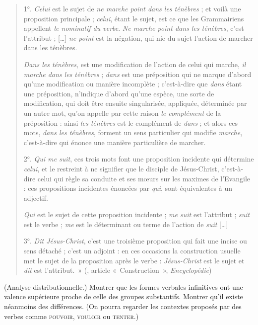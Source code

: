 {\begin{quote}
    1°. \textit{Celui} est le sujet de \textit{ne marche point dans les ténèbres} ; et voilà une proposition principale ; \textit{celui}, étant le sujet, est ce que les Grammairiens appellent \textit{le nominatif du verbe}. \textit{Ne marche point dans les ténèbres}, c’est l’attribut ; […] \textit{ne point} est la négation, qui nie du sujet l’action de marcher dans les ténèbres.

    \textit{Dans les ténèbres}, est une modification de l’action de celui qui marche, \textit{il marche dans les ténèbres} ; \textit{dans} est une préposition qui ne marque d’abord qu’une modification ou manière incomplète ; c’est-à-dire que \textit{dans} étant une préposition, n’indique d’abord qu’une espèce, une sorte de modification, qui doit être ensuite singularisée, appliquée, déterminée par un autre mot, qu’on appelle par cette raison \textit{le complément} de la préposition : ainsi \textit{les ténèbres} est le complément de \textit{dans} ; et alors ces mots, \textit{dans les ténèbres}, forment un sens particulier qui modifie \textit{marche}, c’est-à-dire qui énonce une manière particulière de marcher.

    2°. \textit{Qui me suit}, ces trois mots font une proposition incidente qui détermine \textit{celui}, et le restreint à ne signifier que le disciple de Jésus-Christ, c’est-à-dire celui qui règle sa conduite et ses mœurs sur les maximes de l’Evangile : ces propositions incidentes énoncées par \textit{qui}, sont équivalentes à un adjectif.

    \textit{Qui} est le sujet de cette proposition incidente ; \textit{me suit} est l’attribut ; \textit{suit} est le verbe ; \textit{me} est le dé​​terminant ou terme de l’action de \textit{suit} […]

    3°. \textit{Dit Jésus-Christ}, c’est une troisième proposition qui fait une incise ou sens détaché ; c’est un adjoint : en ces occasions la construction usuelle met le sujet de la proposition après le verbe : \textit{Jésus-Christ} est le sujet et \textit{dit} est l’attribut.~» (\citealt{Dumarsais1754}, article «~Construction~», \textit{Encyclopédie})
    \end{quote}

     ({Analyse distributionnelle.}) Montrer que les formes verbales infinitives ont une valence supérieure proche de celle des groupes substantifs. Montrer qu’il existe néanmoins des différences. (On pourra regarder les contextes proposés par des verbes comme \textsc{pouvoir}, \textsc{vouloir}  ou \textsc{tenter}.)

}
